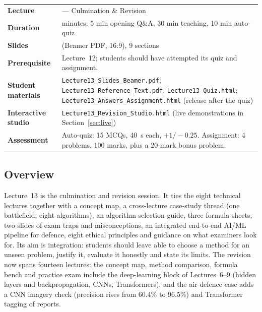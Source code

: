 \documentclass[11pt]{article}
\begin{document}
\begin{center}\small\renewcommand{\arraystretch}{1.25}\begin{tabularx}{\textwidth}{@{}>{\bfseries}p{3.3cm}>{\raggedright\arraybackslash}X@{}}\toprule

\textcolor{NavyN}{Lecture}&13 --- Culmination \& Revision\\
\textcolor{NavyN}{Duration}&45 minutes: 5 min opening Q\&A, 30 min teaching, 10 min auto-quiz\\
\textcolor{NavyN}{Slides}&17 (Beamer PDF, 16:9), 9 sections\\
\textcolor{NavyN}{Prerequisite}&Lecture~12; students should have attempted its quiz and assignment.\\
\textcolor{NavyN}{Student materials}&\texttt{Lecture13\_Slides\_Beamer.pdf}; \texttt{Lecture13\_Reference\_Text.pdf}; \texttt{Lecture13\_Quiz.html}; \texttt{Lecture13\_Answers\_Assignment.html} (release after the quiz)\\
\textcolor{NavyN}{Interactive studio}&\texttt{Lecture13\_Revision\_Studio.html} (live demonstrations in Section~\ref{sec:live})\\
\textcolor{NavyN}{Assessment}&Auto-quiz: 15 MCQs, 40~s each, $+1/-0.25$. Assignment: 4 problems, 100 marks, plus a 20-mark bonus problem.\\\bottomrule\end{tabularx}\end{center}

\subsection*{Overview}Lecture~13 is the culmination and revision session. It ties the eight technical lectures together with a concept map, a cross-lecture case-study thread (one battlefield, eight algorithms), an algorithm-selection guide, three formula sheets, two slides of exam traps and misconceptions, an integrated end-to-end AI/ML pipeline for defence, eight ethical principles and guidance on what examiners look for. Its aim is integration: students should leave able to choose a method for an unseen problem, justify it, evaluate it honestly and state its limits. The revision now spans fourteen lectures: the concept map, method comparison, formula bench and practice exam include the deep-learning block of Lectures~6--9 (hidden layers and backpropagation, CNNs, Transformers), and the air-defence case adds a CNN imagery check (precision rises from 60.4\% to 96.5\%) and Transformer tagging of reports.
\end{document}
